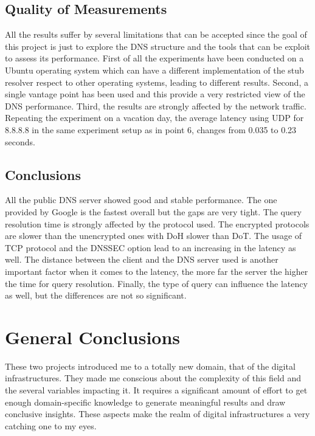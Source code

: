 \documentclass[a4paper,10pt]{article}
\begin{document}
\begin{multicols}{2}
\subsection{Quality of Measurements}
All the results suffer by several limitations that can be accepted since the goal of this project is just to explore the DNS structure and the tools that can be exploit to assess its performance. 
First of all the experiments have been conducted on a Ubuntu operating system which can have a different implementation of the stub resolver 
respect to other operating systems, leading to different results. Second, a single vantage point has been used and this provide a very restricted view of the DNS performance. Third, 
the results are strongly affected by the network traffic. Repeating the experiment on a vacation day, the average latency using UDP for 8.8.8.8 in the same experiment setup
as in point 6, changes from 0.035 to 0.23 seconds.


\subsection{Conclusions}
All the public DNS server showed good and stable performance. The one provided by Google is the fastest overall but the gaps are very tight. The query resolution time is strongly affected
by the protocol used. The encrypted protocols are slower than the unencrypted ones with DoH slower than DoT. The usage of TCP protocol and the DNSSEC option lead to 
an increasing in the latency as well. The distance between the client and the DNS server used is another important factor when it comes to the latency, the
more far the server the higher the time for query resolution. Finally, the type of query can influence the latency as well, but the differences are not so significant.\\


\section{General Conclusions}
These two projects introduced me to a totally new domain, that of the digital infrastructures. They made me conscious about the complexity of this field and the several variables impacting it.
It requires a significant amount of effort to get enough domain-specific knowledge to generate meaningful results and draw conclusive insights. These aspects make the realm of digital infrastructures 
a very catching one to my eyes.



        
\end{multicols}
\end{document}
